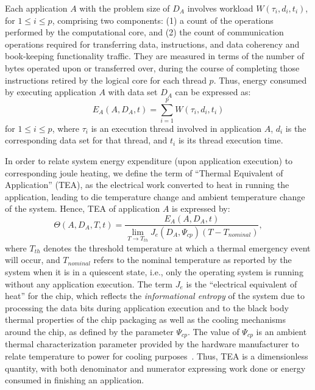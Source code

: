 \documentclass[times, 10pt,twocolumn]{IEEEtran}
\begin{document}
Each application $A$ with the problem size of $D_{A}$ involves
workload $W(\tau_{i},d_{i},t_{i})$, for $1 \leq i \leq p$, comprising two components: 
(1) a count of the operations performed by the computational core, 
and (2) the count of communication operations required for transferring data,
instructions, and data coherency and book-keeping functionality traffic. 
They are measured in terms of the number of bytes operated upon or
transferred over, during the course of completing those instructions retired
by the logical core for each thread $p$.  
Thus, energy consumed by executing application $A$
with data set $D_{A}$ can be expressed as:
\begin{equation}
\label{eq:eworkload} 
E_{A}(A,D_{A},t) = \displaystyle \sum_{i=1}^{p}W(\tau_{i},d_{i},t_{i})
\end{equation}
for $1\leq i \leq p$, where $\tau_{i}$ is an execution thread involved in
application $A$, $d_{i}$ is the corresponding data set for that thread,
and $t_{i}$ is its thread execution time.

In order to relate system energy expenditure (upon
application execution) to corresponding joule heating, we define the term of
``Thermal Equivalent of Application'' (TEA), as the
electrical work converted to heat in running the application,
leading to die temperature change and ambient temperature
change of the system. 
Hence, TEA of application $A$ is expressed by:
\begin{equation}
\label{eq:tea} \Theta(A, D_{A}, T, t) =
\frac{E_{A}(A, D_{A}, t)}{\displaystyle \lim_{T \to T_{th}} J_e(D_{A}, \Psi_{cp}) (T -T_{nominal})},
\end{equation} 
where $T_{th}$ denotes the threshold temperature
at which a thermal emergency event will occur, and $T_{nominal}$ refers to the
nominal temperature as reported by the system when it is in a quiescent
state, i.e., only the operating system is running without any application execution.
The term $J_{e}$ is the ``electrical equivalent of
heat'' for the chip, which reflects the \textit{informational
entropy} of the system due to processing the
data bits during application execution and to the
black body thermal properties of the chip packaging as well as the cooling
mechanisms around the chip, as defined by the  parameter $\Psi_{cp}$.
The value of $\Psi_{cp}$ is an ambient
thermal characterization parameter provided by the hardware
manufacturer to relate temperature to power for cooling purposes~\cite{Intel2006}.
Thus, TEA is a dimensionless quantity, with
both denominator and numerator expressing work done or energy consumed
in finishing an application.
\end{document}
